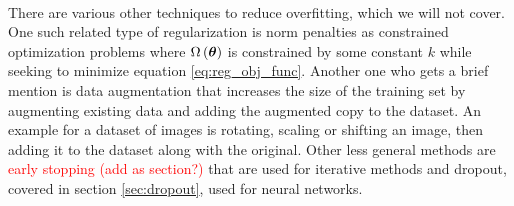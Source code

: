 \\
There are various other techniques to reduce overfitting, which we will not cover. One such related type of regularization is norm penalties as constrained optimization problems where $\Omega \left (\boldsymbol{\theta}\right)$ is constrained by some constant $k$ while seeking to minimize equation \ref{eq:reg_obj_func}. Another one who gets a brief mention is data augmentation that increases the size of the training set by augmenting existing data and adding the augmented copy to the dataset. An example for a dataset of images is rotating, scaling or shifting an image, then adding it to the dataset along with the original. Other less general methods are \textcolor{red}{early stopping (add as section?)} that are used for iterative methods and dropout, covered in section \ref{sec:dropout}, used for neural networks. 


